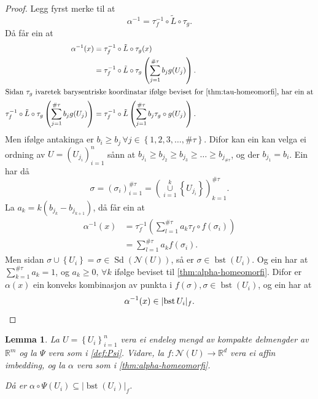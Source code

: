 \documentclass[a4paper, 12pt, norsk]{article}
\theoremstyle{plain}
\newtheorem{lemma}[theorem]{Lemma}
\theoremstyle{definition}
\newcommand{\Rb}{\mathbb{R}}
\newcommand{\Nc}{\mathcal{N}}
\newcommand{\union}{ \mathop{\cup}\limits }
\newcommand{\gr}[1]{ \lvert #1 \rvert } %
\newcommand{\set}[1]{ \left\{ #1 \right\} } %
\newcommand{\tuple}[1]{ \left( #1 \right) } %
\DeclareMathOperator{\Sd}{Sd} %
\DeclareMathOperator{\bst}{bst} %
\begin{document}
\begin{proof}
	Legg fyrst merke til at
	\[
		\alpha^{-1} = \tau_f^{-1} \circ \tilde{L} \circ \tau_g.
	\]
	Då får ein at
	\begin{align*}
		\alpha^{-1}(x) &= \tau_f^{-1} \circ \tilde{L} \circ \tau_g (x) \\
		&= \tau_f^{-1} \circ \tilde{L} \circ \tau_g \tuple{\sum_{j=1}^{\#\tau} b_j g(U_j)}. \\
		\intertext{Sidan \( \tau_g \) ivaretek barysentriske koordinatar ifølge beviset for \autoref{thm:tau-homeomorfi}, har ein at}
		\tau_f^{-1} \circ \tilde{L} \circ \tau_g \tuple{\sum_{j=1}^{\#\tau} b_j g(U_j)} &= \tau_f^{-1} \circ \tilde{L} \tuple{\sum_{j=1}^{\#\tau} b_j \tau_g \circ g(U_j)}.
	\end{align*}
	Men ifølge antakinga er \( b_i \geq b_j \, \forall j \in \set{1, 2, 3, \dots, \#\tau} \). Difor kan ein kan velga ei ordning av \( U = \tuple{U_{j_i}}_{i=1}^n \) sånn at \( b_{j_1} \geq b_{j_2} \geq b_{j_3} \geq \dots \geq b_{j_{\#\tau}} \), og der \( b_{j_1}=b_i \). Ein har då 
	\[
		\sigma = \tuple{\sigma_i}_{i=1}^{\#\tau} = \tuple{\union_{i=1}^k \set{U_{j_i}}}_{k=1}^{\#\tau}.
	\]
	La \( a_k = k\tuple{b_{j_k}-b_{j_{k+1}}} \), då får ein at
	\begin{align*}
		\alpha^{-1}(x) &= \tau_f^{-1} \tuple{\sum_{l=1}^{\#\tau}a_k \tau_f \circ f(\sigma_i)} \\
		&= \sum_{l=1}^{\#\tau} a_k f(\sigma_i).
	\end{align*}
	Men sidan \( \sigma \union \set{U_i} = \sigma \in \Sd(\Nc(U)) \), så er \( \sigma \in \bst(U_i) \). Og ein har at \( \sum_{k=1}^{\#\tau} a_k = 1 \), og \( a_k \geq 0, \, \forall k \) ifølge beviset til \autoref{thm:alpha-homeomorfi}. Difor er \( \alpha(x) \) ein konveks kombinasjon av punkta i \( f(\sigma), \sigma \in \bst(U_i) \), og ein har at
	\[
		\alpha^{-1}(x) \in \gr{\bst{U_i}}_f. \qedhere
	\]
\end{proof}

\begin{lemma} \label{thm:Psi-inni-bst}
	La \( U = \set{U_i}_{i=1}^n \) vera ei endeleg mengd av kompakte delmengder av \( \Rb^m \) og la \( \Psi \) vera som i \autoref{def:Psi}. Vidare, la \( f: \Nc(U) \to \Rb^d \) vera ei affin imbedding, og la \( \alpha \) vera som i \autoref{thm:alpha-homeomorfi}.

	Då er \( \alpha \circ \Psi(U_i) \subseteq \gr{\bst(U_i)}_f \).
\end{lemma}
\end{document}
